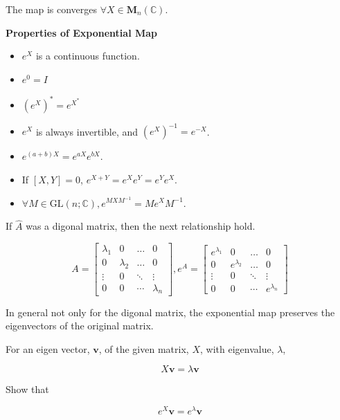 The map is converges $\forall X \in \mathbf{M}_{n}(\mathbb{C})$.

\begin{theorem} \textbf{Properties of Exponential Map}
    \begin{itemize}
        \item $e^X$ is a continuous function.
        \item $e^0 = I$
        \item $(e^X)^\ast = e^{X^\ast}$
        \item $e^X$ is always invertible, and $(e^X)^{-1} = e^{-X}$.
        \item $e^{(a+b)X} = e^{aX} e^{bX}$.
        \item If $[X, Y] = 0$, $e^{X+Y} = e^{X}e^{Y} = e^{Y}e^{X}$.
        \item $\forall M \in \text{GL}(n; \mathbb{C}), e^{M X M^{-1}} = M e^{X} M^{-1}$. 
    \end{itemize}
\end{theorem}

If $\hat{A}$ was a digonal matrix, then the next relationship hold.

\begin{equation*}
    A = \begin{bmatrix}
        \lambda_1 & 0 & \dots & 0 \\
        0 & \lambda_2 & \dots & 0 \\
        \vdots & 0 & \ddots & \vdots\\
        0 & 0 & \cdots & \lambda_n
    \end{bmatrix},
    e^A = \begin{bmatrix}
        e^{\lambda_1} & 0 & \dots & 0 \\
        0 & e^{\lambda_2} & \dots & 0 \\
        \vdots & 0 & \ddots & \vdots\\
        0 & 0 & \cdots & e^{\lambda_n}
    \end{bmatrix}
\end{equation*}

In general not only for the digonal matrix, 
the exponential map preserves the eigenvectors of the original matrix.

\begin{exercise}
    For an eigen vector, $\mathbf{v}$, of the given matrix, $X$, with eigenvalue, $\lambda$,

    \begin{equation}
        X \mathbf{v} = \lambda \mathbf{v}
    \end{equation}

    Show that 

    \begin{equation*}
        e^X \mathbf{v} = e^\lambda \mathbf{v}
    \end{equation*}
\end{exercise}


